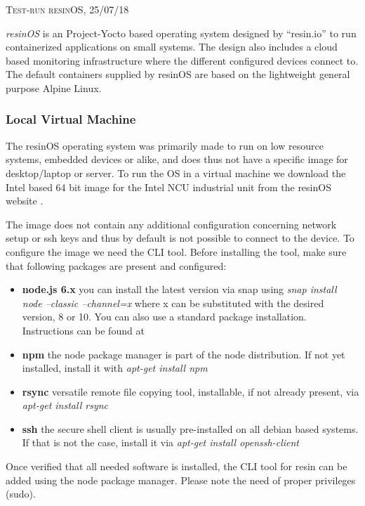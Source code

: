 \documentclass[]{scrartcl}
\begin{document}
{\small\textsc{Test-run resinOS, 25/07/18} \bigskip}

\textit{resinOS} is an Project-Yocto based operating system designed by ``resin.io'' to run containerized applications on small systems. The design also includes a cloud based monitoring infrastructure where the different configured devices connect to. The default containers supplied by resinOS are based on the lightweight general purpose Alpine Linux.

\subsubsection{Local Virtual Machine}

The resinOS operating system was primarily made to run on low resource systems, embedded devices or alike, and does thus not have a specific image for desktop/laptop or server. To run the OS in a virtual machine we download the Intel based 64 bit image for the Intel NCU industrial unit from the resinOS website \cite{resin01}.

The image does not contain any additional configuration concerning network setup or ssh keys and thus by default is not possible  to connect to the device.
To configure the image we need the CLI tool. Before installing the tool, make sure that following packages are present and configured:

\begin{itemize}
	
	\item \textbf{node.js 6.x} you can install the latest version via snap using \textit{snap install node --classic --channel=x} where x can be substituted with the desired version, 8 or 10. You can also use a standard package installation. Instructions can be found at \cite{node01}
	\item \textbf{npm} the node package manager is part of the node distribution. If not yet installed, install it with \textit{apt-get install npm}
	\item \textbf{rsync} versatile remote file copying tool, installable, if not already present, via \textit{apt-get install rsync}
	\item \textbf{ssh} the secure shell client is usually pre-installed on all debian based systems. If that is not the case, install it via \textit{apt-get install openssh-client}
	
\end{itemize}

Once verified that all needed software is installed, the CLI tool for resin can be added using the node package manager. Please note the need of proper privileges (sudo).
\end{document}
